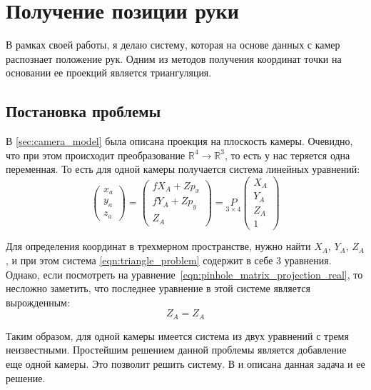\documentclass[12pt, a4paper]{article}
\begin{document}
\section{Получение позиции руки}
В рамках своей работы, я делаю систему, которая на основе данных с камер
распознает положение рук. Одним из методов получения координат точки на
основании ее проекций является триангуляция. \subsection{Постановка проблемы} В
\ref{sec:camera_model} была описана проекция на плоскость камеры. Очевидно, что
при этом происходит преобразование $\mathbb{R}^4 \rightarrow \mathbb{R}^3$, то
есть у нас теряется одна переменная. То есть для одной камеры получается
система линейных уравнений:
\begin{equation}
    \begin{pmatrix}
        x_a\\
        y_a\\
        z_a
    \end{pmatrix} = \begin{pmatrix}
        f X_A + Z p_x\\
        f Y_A + Z p_y\\
        Z_A 
    \end{pmatrix} = \underset{3 \times 4}{P} \begin{pmatrix}
        X_A\\
        Y_A\\
        Z_A\\
        1
    \end{pmatrix}
\label{eqn:triangle_problem}
\end{equation}

Для определения координат в трехмерном пространстве, нужно найти $X_A$, $Y_A$,
$Z_A$, и при этом система \eqref{eqn:triangle_problem} содержит в себе 3
уравнения. Однако, если посмотреть на
уравнение~\eqref{eqn:pinhole_matrix_projection_real}, то несложно заметить, что
последнее уравнение в этой системе является вырожденным:
\begin{equation*}
    Z_A = Z_A
\end{equation*}
\par
Таким образом, для одной камеры имеется система из двух уравнений с тремя
неизвестными. Простейшим решением данной проблемы является добавление еще одной
камеры. Это позволит решить систему. В \cite{multiview_cv} и \cite{dlt_temugeb}
описана данная задача и ее решение. 
\end{document}
